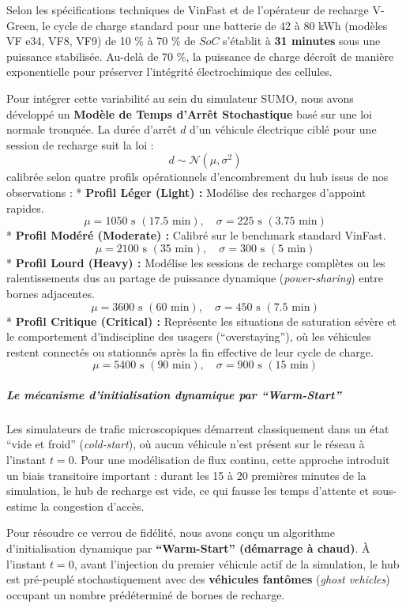 \documentclass[10pt, a4paper]{article}
\begin{document}
Selon les spécifications techniques de VinFast et de l'opérateur de
recharge V-Green, le cycle de charge standard pour une batterie de 42 à
80 kWh (modèles VF e34, VF8, VF9) de 10 \% à 70 \% de \(SoC\) s'établit
à \textbf{31 minutes} sous une puissance stabilisée. Au-delà de 70 \%,
la puissance de charge décroît de manière exponentielle pour préserver
l'intégrité électrochimique des cellules.

Pour intégrer cette variabilité au sein du simulateur SUMO, nous avons
développé un \textbf{Modèle de Temps d'Arrêt Stochastique} basé sur une
loi normale tronquée. La durée d'arrêt \(d\) d'un véhicule électrique
ciblé pour une session de recharge suit la loi :
\[d \sim \mathcal{N}(\mu, \sigma^2)\] calibrée selon quatre profils
opérationnels d'encombrement du hub issus de nos observations : *
\textbf{Profil Léger (Light) :} Modélise des recharges d'appoint
rapides.
\[\mu = 1050 \text{ s } (17.5 \text{ min}), \quad \sigma = 225 \text{ s } (3.75 \text{ min})\]
* \textbf{Profil Modéré (Moderate) :} Calibré sur le benchmark standard
VinFast.
\[\mu = 2100 \text{ s } (35 \text{ min}), \quad \sigma = 300 \text{ s } (5 \text{ min})\]
* \textbf{Profil Lourd (Heavy) :} Modélise les sessions de recharge
complètes ou les ralentissements dus au partage de puissance dynamique
(\emph{power-sharing}) entre bornes adjacentes.
\[\mu = 3600 \text{ s } (60 \text{ min}), \quad \sigma = 450 \text{ s } (7.5 \text{ min})\]
* \textbf{Profil Critique (Critical) :} Représente les situations de
saturation sévère et le comportement d'indiscipline des usagers
(``overstaying''), où les véhicules restent connectés ou stationnés
après la fin effective de leur cycle de charge.
\[\mu = 5400 \text{ s } (90 \text{ min}), \quad \sigma = 900 \text{ s } (15 \text{ min})\]

\subparagraph{Le mécanisme d'initialisation dynamique par
``Warm-Start''}\label{le-muxe9canisme-dinitialisation-dynamique-par-warm-start}

Les simulateurs de trafic microscopiques démarrent classiquement dans un
état ``vide et froid'' (\emph{cold-start}), où aucun véhicule n'est
présent sur le réseau à l'instant \(t = 0\). Pour une modélisation de
flux continu, cette approche introduit un biais transitoire important :
durant les 15 à 20 premières minutes de la simulation, le hub de
recharge est vide, ce qui fausse les temps d'attente et sous-estime la
congestion d'accès.

Pour résoudre ce verrou de fidélité, nous avons conçu un algorithme
d'initialisation dynamique par \textbf{``Warm-Start'' (démarrage à
chaud)}. À l'instant \(t=0\), avant l'injection du premier véhicule
actif de la simulation, le hub est pré-peuplé stochastiquement avec des
\textbf{véhicules fantômes} (\emph{ghost vehicles}) occupant un nombre
prédéterminé de bornes de recharge.
\end{document}
